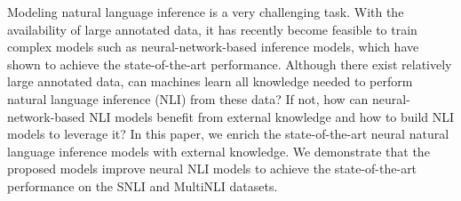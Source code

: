 Modeling natural language inference is a very challenging task. With the availability of large annotated data, it has recently become feasible to train complex models such as neural-network-based inference models, which have shown to achieve the state-of-the-art performance. Although there exist relatively large annotated data, can machines learn all knowledge needed to perform natural language inference (NLI) from these data? If not, how can neural-network-based NLI models benefit from external knowledge and how to build NLI models to leverage it? In this paper, we enrich the state-of-the-art neural natural language inference models with external knowledge. We demonstrate that the proposed models improve neural NLI models to achieve the state-of-the-art performance on the SNLI and MultiNLI datasets.
